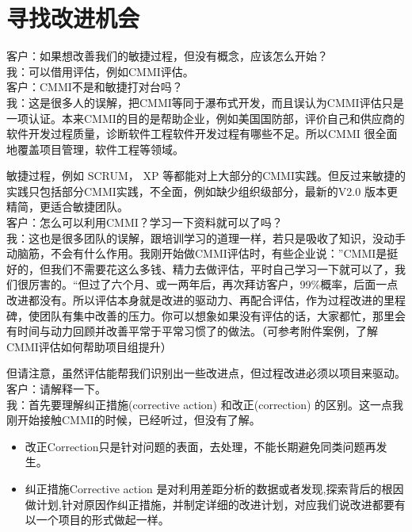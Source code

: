 \chapter{寻找改进机会} %

客户：如果想改善我们的敏捷过程，但没有概念，应该怎么开始？\\
我：可以借用评估，例如CMMI评估。\\
客户：CMMI不是和敏捷打对台吗？\\
我：这是很多人的误解，把CMMI等同于瀑布式开发，而且误认为CMMI评估只是一项认证。本来CMMI的目的是帮助企业，例如美国国防部，评价自己和供应商的软件开发过程质量，诊断软件工程软件开发过程有哪些不足。所以CMMI
很全面地覆盖项目管理，软件工程等领域。

敏捷过程，例如 SCRUM， XP
等都能对上大部分的CMMI实践。但反过来敏捷的实践只包括部分CMMI实践，不全面，例如缺少组织级部分，最新的V2.0
版本更精简，更适合敏捷团队。\\
客户：怎么可以利用CMMI？学习一下资料就可以了吗？\\
我：这也是很多团队的误解，跟培训学习的道理一样，若只是吸收了知识，没动手动脑筋，不会有什么作用。我刚开始做CMMI评估时，有些企业说：''CMMI是挺好的，但我们不需要花这么多钱、精力去做评估，平时自己学习一下就可以了，我们很厉害的。``但过了六个月、或一两年后，再次拜访客户，99\%概率，后面一点改进都没有。所以评估本身就是改进的驱动力、再配合评估，作为过程改进的里程碑，使团队有集中改善的压力。你可以想象如果没有评估的话，大家都忙，那里会有时间与动力回顾并改善平常于平常习惯了的做法。（可参考附件案例，了解CMMI评估如何帮助项目组提升）

但请注意，虽然评估能帮我们识别出一些改进点，但过程改进必须以项目来驱动。\\
客户：请解释一下。\\
我：首先要理解纠正措施(corrective action) 和改正(correction)
的区别。这一点我刚开始接触CMMI的时候，已经听过，但没有了解。

\begin{itemize}
\tightlist
\item
  改正Correction只是针对问题的表面，去处理，不能长期避免同类问题再发生。
\item
  纠正措施Corrective action
  是对利用差距分析的数据或者发现,探索背后的根因做计划,针对原因作纠正措施，并制定详细的改进计划，对应我们说改进都要有以一个项目的形式做起一样。
\end{itemize}

